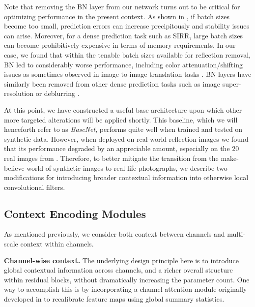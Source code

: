 \documentclass[10pt,twocolumn,letterpaper]{article}
\begin{document}
Note that removing the BN layer from our network  turns out to be critical for optimizing performance in the present context.  As shown in \cite{wu2018group}, if batch sizes become too small, prediction errors can increase precipitously and stability issues can arise.  Moreover, for a dense prediction task such as SIRR, large batch sizes can become prohibitively expensive in terms of memory requirements.  In our case, we found that within the tenable batch sizes available for reflection removal, BN led to considerably worse performance, including color attenuation/shifting issues as sometimes observed in image-to-image translation tasks \cite{fan2017generic,Isola_2017_CVPR,Zhu_2017_ICCV}.  BN layers have similarly been removed from other dense prediction tasks such as image super-resolution \cite{Lim_2017_CVPR_Workshops} or deblurring \cite{Nah_2017_CVPR}.







At this point, we have constructed a useful base architecture upon which other more targeted alterations will be applied shortly.  This baseline, which we will henceforth refer to as \emph{BaseNet},  performs quite well when trained and tested on synthetic data.  However, when deployed on real-world reflection images we found that its performance degraded by an appreciable amount, especially on the 20 real images from \cite{zhang2018single}.  Therefore, to better mitigate the transition from the make-believe world of synthetic images to real-life photographs, we describe two modifications for introducing broader contextual information into otherwise local convolutional filters.




\subsection{Context Encoding Modules}

As mentioned previously, we consider both context between channels and multi-scale context within channels.

\vspace{5pt}
{\noindent \bf Channel-wise context.} 
The underlying design principle here is to introduce global contextual information across channels, and a richer overall structure within residual blocks, without dramatically increasing the parameter count.  One way to accomplish this is by incorporating a channel attention module originally developed in \cite{Hu_2018_CVPR} to recalibrate feature maps using global summary statistics.  
\end{document}
